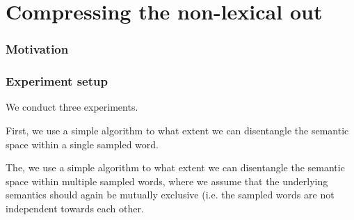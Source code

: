 \documentclass[a4paper,12pt,twoside,openright]{report}
\begin{document}

\section{Compressing the non-lexical out}
\subsubsection{Motivation}
\subsubsection{Experiment setup}


We conduct three experiments.

First, we use a simple algorithm to what extent we can disentangle the semantic space within a single sampled word.

The, we use a simple algorithm to what extent we can disentangle the semantic space within multiple sampled words, where we assume that the underlying semantics should again be mutually exclusive (i.e. the sampled words are not independent towards each other.
\end{document}

